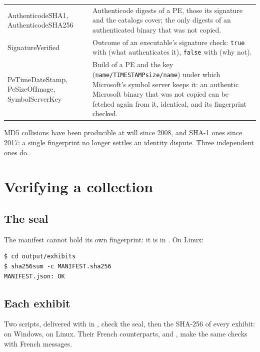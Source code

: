\documentclass[11pt,a4paper,oneside]{report}
\begin{document}
\begin{longtable}{@{}>{\ttfamily}L{4.2cm}L{10.2cm}@{}}
AuthenticodeSHA1, AuthenticodeSHA256 & Authenticode digests of a PE, those its
  signature and the catalogs cover; the only digests of an authenticated binary
  that was not copied. \\
SignatureVerified & Outcome of an executable's signature check: \texttt{true}
  with  (what authenticates it), \texttt{false} with
   (why not). \\
PeTimeDateStamp, PeSizeOfImage, SymbolServerKey & Build of a PE and the key
  (\texttt{name/TIMESTAMPsize/name}) under which Microsoft's symbol server keeps
  it: an authentic Microsoft binary that was not copied can be fetched again
  from it, identical, and its fingerprint checked. \\
\bottomrule
\end{longtable}

\begin{note}
MD5 collisions have been producible at will since 2008, and SHA-1 ones since
2017: a single fingerprint no longer settles an identity dispute. Three
independent ones do.
\end{note}

\section{Verifying a collection}\label{sec:verif}

\subsection{The seal}

The manifest cannot hold its own fingerprint: it is in
. On Linux:

\begin{lstlisting}
$ cd output/exhibits
$ sha256sum -c MANIFEST.sha256
MANIFEST.json: OK
\end{lstlisting}

\subsection{Each exhibit}

Two scripts, delivered with  in , check the
seal, then the SHA-256 of every exhibit:  on
Windows,  on Linux. Their French counterparts,
 and , make the
same checks with French messages.
\end{document}
